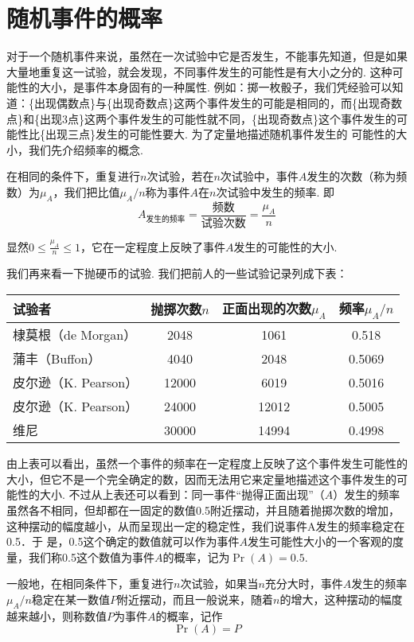 \section{随机事件的概率}
对于一个随机事件来说，虽然在一次试验中它是否发生，不能事先知道，但是如果大量地重复这一试验，就会发现，不同事件发生的可能性是有大小之分的. 这种可能性的大小，是事件本身固有的一种属性. 例如：掷一枚骰子，我们凭经验可以知道：\{出现偶数点\}与\{出现奇数点\}这两个事件发生的可能是相同的，而\{出现奇数点\}和\{出现3点\}这两个事件发生的可能性就不同，\{出现奇数点\}这个事件发生的可能性比\{出现三点\}发生的可能性要大. 为了定量地描述随机事件发生的
可能性的大小，我们先介绍频率的概念.

在相同的条件下，重复进行$n$次试验，若在$n$次试验中，事件$A$发生的次数（称为频数）为$\mu_A$，我们把比值$\mu_A/n$称为事件$A$在$n$次试验中发生的频率. 即
\[A_{\text{发生的频率}}=\frac{\text{频数}}{\text{试验次数}}=\frac{\mu_A}{n}\]

显然$0\le \frac{\mu_A}{n}\le 1$，它在一定程度上反映了事件$A$发生的可能性的大小.

我们再来看一下抛硬币的试验. 我们把前人的一些试验记录列成下表：
\begin{center}
\begin{tabular}{l|ccc}
\hline
    试验者 & 抛掷次数$n$ & 正面出现的次数$\mu_A$ & 频率$\mu_A/n$\\
\hline
棣莫根（de Morgan）&2048&1061&0.518\\
蒲丰（Buffon）&4040&2048&0.5069\\
皮尔逊（K. Pearson）&12000&6019&0.5016\\
皮尔逊（K. Pearson）&24000&12012&0.5005\\
维尼&30000&14994&0.4998\\
\hline
\end{tabular}
\end{center}

由上表可以看出，虽然一个事件的频率在一定程度上反映了这个事件发生可能性的大小，但它不是一个完全确定的数，因而无法用它来定量地描述这个事件发生的可能性的大小. 不过从上表还可以看到：同一事件“抛得正面出现”（$A$）发生的频率虽然各不相同，但却都在一固定的数值0.5附近摆动，并且随着抛掷次数的增加，这种摆动的幅度越小，从而呈现出一定的稳定性，我们说事件A发生的频率稳定在0.5．于
是，0.5这个确定的数值就可以作为事件$A$发生可能性大小的一个客观的度量，我们称0.5这个数值为事件$A$的概率，记为$\Pr(A)=0.5$.

一般地，在相同条件下，重复进行$n$次试验，如果当$n$充分大时，事件$A$发生的频率$\mu_A/n$稳定在某一数值$P$附近摆动，而且一般说来，随着$n$的增大，这种摆动的幅度越来越小，则称数值$P$为事件$A$的概率，记作
\[\Pr(A)=P\]

